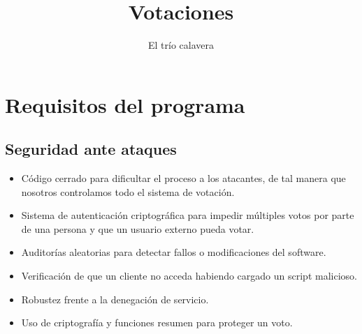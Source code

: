 \documentclass{article}
\title{Votaciones}
\author{El trío calavera}
\begin{document}
\maketitle

\tableofcontents
\newpage

\section{Requisitos del programa}
\subsection{Seguridad ante ataques}
\begin{itemize}
    \item Código cerrado para dificultar el proceso a los atacantes, de tal manera que 
    nosotros controlamos todo el sistema de votación.
    \item Sistema de autenticación criptográfica para impedir múltiples votos por parte 
    de una persona y que un usuario externo pueda votar.
    \item Auditorías aleatorias para detectar fallos o modificaciones del software.
    \item Verificación de que un cliente no acceda habiendo cargado un script malicioso.
    \item Robustez frente a la denegación de servicio.
    \item Uso de criptografía y funciones resumen para proteger un voto.
\end{itemize}
\end{document}
